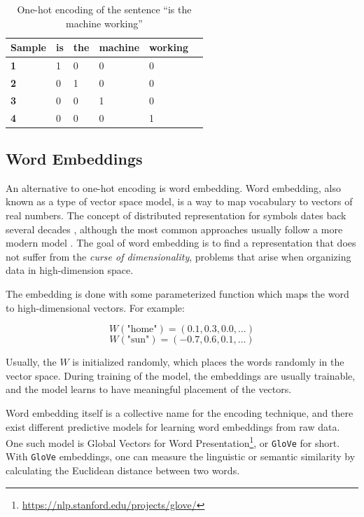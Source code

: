 \begin{table}[h]
    \centering
    \begin{tabular}{|l|l|l|l|l|l|}
        \hline
        \textbf{Sample} & \textbf{is} & \textbf{the} & \textbf{machine} & \textbf{working} \\ \hline
        \textbf{1}      & 1           & 0            & 0                & 0                \\ \hline
        \textbf{2}      & 0           & 1            & 0                & 0                \\ \hline
        \textbf{3}      & 0           & 0            & 1                & 0                \\ \hline
        \textbf{4}      & 0           & 0            & 0                & 1                \\ \hline
    \end{tabular}
    \caption{One-hot encoding of the sentence ``is the machine working''}
    \label{table:one_hot_encoding}
\end{table}

\subsection{Word Embeddings}
An alternative to one-hot encoding is word embedding. Word embedding, also known as a type of vector space model, is a way to map vocabulary to vectors of real numbers. The concept of distributed representation for symbols dates back several decades \citep{hinton1986learning}, although the most common approaches usually follow a more modern model \citep{bengio2003neural}. The goal of word embedding is to find a representation that does not suffer from the \emph{curse of dimensionality}, problems that arise when organizing data in high-dimension space. 

The embedding is done with some parameterized function which maps the word to high-dimensional vectors. For example:

\begin{equation*}
    W(\text{"home"}) = (0.1, 0.3, 0.0, \ldots)
\end{equation*}
\begin{equation*}
    W(\text{"sun"}) = (-0.7, 0.6, 0.1, \ldots)
\end{equation*}

Usually, the \(W\) is initialized randomly, which places the words randomly in the vector space. During training of the model, the embeddings are usually trainable, and the model learns to have meaningful placement of the vectors.

Word embedding itself is a collective name for the encoding technique, and there exist different predictive models for learning word embeddings from raw data. One such model is Global Vectors for Word Presentation\footnote{\url{https://nlp.stanford.edu/projects/glove/}}, or {\tt GloVe} for short. With {\tt GloVe} embeddings, one can measure the linguistic or semantic similarity by calculating the Euclidean distance between two words.